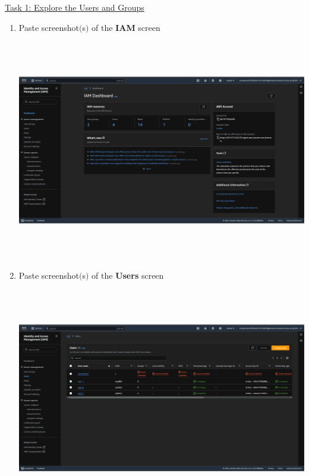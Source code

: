 \documentclass[11pt]{article}
\begin{document}
\vspace{1.5cm}

\newpage

\noindent\underline{Task 1: Explore the Users and Groups}

\begin{enumerate}
    \item Paste screenshot$($s$)$ of the \textbf{IAM} screen\\

    \vspace{5mm}
    
    
    {\centering
    \includegraphics[width=6.1in, height=3.8in]{pics/1.png}
    }
    
    \item Paste screenshot$($s$)$ of the \textbf{Users} screen \\

    \vspace{5mm}

    {\centering
    \includegraphics[width=6.1in, height=3.8in]{pics/2.png}
    }
    

\end{enumerate}
\end{document}
